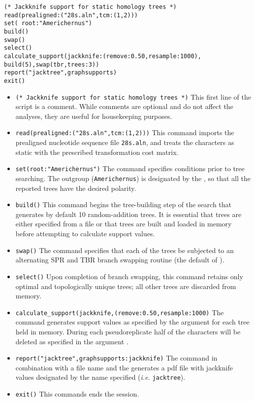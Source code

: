 \begin{verbatim}
(* Jackknife support for static homology trees *)
read(prealigned:("28s.aln",tcm:(1,2)))
set( root:"Americhernus")
build()
swap()
select()
calculate_support(jackknife:(remove:0.50,resample:1000), 
build(5),swap(tbr,trees:3))
report("jacktree",graphsupports)
exit()
\end{verbatim}

\begin{itemize}
\item \texttt{(* Jackknife support for static homology trees *)} This first line of the script is a comment. While
 comments are optional and do not affect the analyses, they are useful for housekeeping purposes.
\item \texttt{read(prealigned:("28s.aln",tcm:(1,2)))} This command imports the prealigned nucleotide sequence 
file \texttt{28s.aln}, and treats the characters as static with the prescribed transformation cost matrix.
\item \texttt{set(root:"Americhernus")} The  command specifies conditions prior to tree 
searching. The outgroup (\texttt{Americhernus}) is designated by the , so that all the reported 
trees have the desired polarity.     
\item \texttt{build()} This command begins the tree-building step of the search that generates by default 10 
random-addition trees. It is essential that trees are either specified from a file or that trees are built and loaded in 
memory before attempting to calculate support values.
\item \texttt{swap()} The  command specifies that each of the trees be subjected to an 
alternating SPR and TBR branch swapping routine (the default of \poy).
\item \texttt{select()} Upon completion of branch swapping, this command retains only optimal and topologically 
unique trees; all other trees are discarded from memory. 
\item \texttt{calculate\_support(jackknife,(remove:0.50,resample:1000)} The  
command generates support values as specified by the  argument for each tree held in 
memory. During each pseudoreplicate half of the characters will be deleted as specified in the argument
. 
\item \texttt{report("jacktree",graphsupports:jackknife)}  The  command in combination with 
a file name and the  generates a pdf file with jackknife values designated by the 
name specified (\emph{i.e.} \texttt{jacktree}). 
\item \texttt{exit()} This commands ends the \poy session.
\end{itemize}

